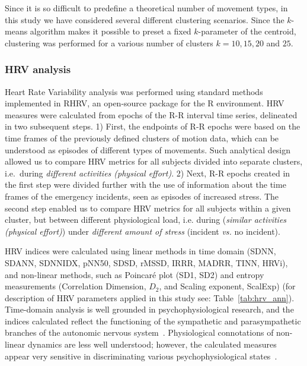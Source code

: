 \documentclass[twocolumn]{bmcart}
\begin{document}

Since it is so difficult to predefine a theoretical number of movement types, in this study we have considered several different clustering scenarios. Since the $k$-means algorithm makes it possible to preset a fixed $k$-parameter of the centroid, clustering was performed for a various number of clusters $k = 10, 15, 20$ and $25$.

\subsubsection{HRV analysis}

Heart Rate Variability analysis was performed using standard methods implemented in RHRV, an open-source package for the R environment. HRV measures were calculated from epochs of the R-R interval time series, delineated in two subsequent steps. 1) First, the endpoints of R-R epochs were based on the time frames of the previously defined clusters of motion data, which can be understood as episodes of different types of movements. Such analytical design allowed us to compare HRV metrics for all subjects divided into separate clusters, i.e.\ during \textit{different activities (physical effort)}. 2) Next, R-R epochs created in the first step were divided further with the use of information about the time frames of the emergency incidents, seen as episodes of increased stress. The second step enabled us to compare HRV metrics for all subjects within a given cluster, but between different physiological load, i.e. during  (\textit{similar activities (physical effort)}) under \textit{different amount of stress} (incident \textit{vs.} no incident).


HRV indices were calculated using linear methods in time domain (SDNN, SDANN, SDNNIDX, pNN50, SDSD, rMSSD, IRRR, MADRR, TINN, HRVi), and non-linear methods, such as Poincar\'e plot (SD1, SD2) and entropy measurements (Correlation Dimension, $D_2$, and Scaling exponent, ScalExp) (for description of HRV parameters applied in this study see: Table~\ref{tab:hrv_ann}). Time-domain analysis is well grounded in psychophysiological research, and the indices calculated reflect the functioning of the sympathetic and parasympathetic branches of the autonomic nervous system~\cite{berntson1997heart}. Physiological connotations of non-linear dynamics are less well understood; however, the calculated measures appear very sensitive in discriminating various psychophysiological states~\cite{sassi2015advances,young2015we}.
\end{document}
